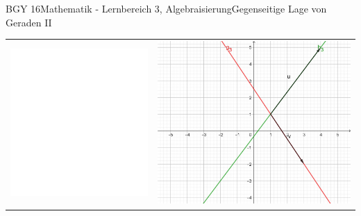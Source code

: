 \documentclass[oneside,openany,headings=optiontotoc,11pt,numbers=noenddot]{scrreprt}
\begin{document}
\begin{worksheet}{BGY 16}{Mathematik - Lernbereich 3, Algebraisierung}{Gegenseitige Lage von Geraden II}
\begin{framed}
\begin{center}
\begin{tabularx}{\textwidth}{Xr}
					\includegraphics[scale=0.29]{../empty.jpg} &
					\includegraphics[scale=0.29]{Bilder/ghSchnitt.jpg}
				\end{tabularx}
			\end{center}
		\end{framed}
	\end{worksheet}
\end{document}
